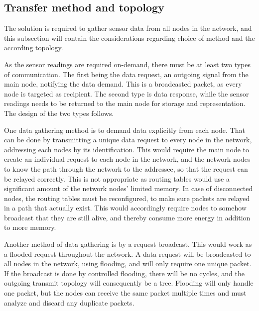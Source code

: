 \subsection{Transfer method and topology}
The solution is required to gather sensor data from all nodes in the network, and this subsection will contain the considerations regarding choice of method and the according topology.


As the sensor readings are required on-demand, there must be at least two types of communication. The first being the data request, an outgoing signal from the main node, notifying the data demand. This is a broadcasted packet, as every node is targeted as recipient. The second type is data response, while the sensor readings needs to be returned to the main node for storage and representation. The design of the two types follows.

One data gathering method is to demand data explicitly from each node. That can be done by transmitting a unique data request to every node in the network, addressing each nodes by its identification. This would require the main node to create an individual request to each node in the network, and the network nodes to know the path through the network to the addressee, so that the request can be relayed correctly. This is not appropriate as routing tables would use a significant amount of the network nodes' limited memory. In case of disconnected nodes, the routing tables must be reconfigured, to make sure packets are relayed in a path that actually exist. This would accordingly require nodes to somehow broadcast that they are still alive, and thereby consume more energy in addition to more memory.

Another method of data gathering is by a request broadcast. This would work as a flooded request throughout the network.
A data request will be broadcasted to all nodes in the network, using flooding, and will only require one unique packet. 
If the broadcast is done by controlled flooding, there will be no cycles, and the outgoing transmit topology will consequently be a tree. 
Flooding will only handle one packet, but the nodes can receive the same packet multiple times and must analyze and discard any duplicate packets.

